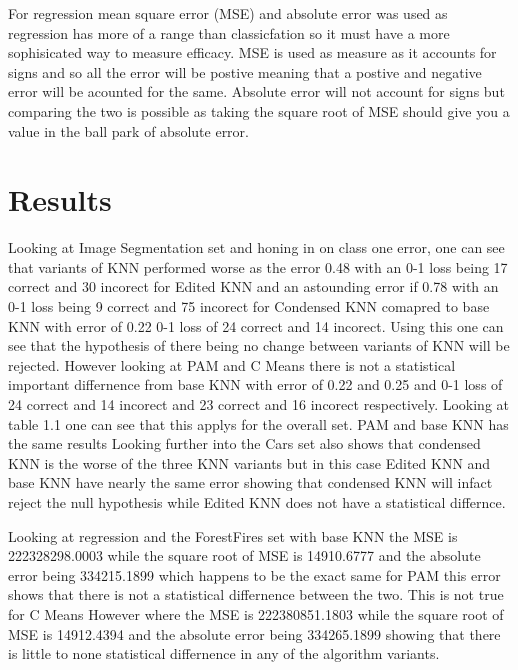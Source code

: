 \documentclass[twoside,11pt]{article}
\begin{document}
For regression mean square error (MSE) and absolute error was used as regression has more of a range than classicfation so it must 
have a more sophisicated way to measure efficacy. MSE is used as measure as it accounts for signs and so all the error will be postive
meaning that a postive and negative error will be acounted for the same. Absolute error will not account for signs but comparing the two
is possible as taking the square root of MSE should give you a value in the ball park of absolute error. 



\section{Results}
Looking at Image Segmentation set and honing in on class one error, one can see that variants of KNN performed worse as the error 0.48 with an 0-1 loss being 
17 correct and 30 incorect for Edited KNN and an astounding error if 0.78 with an 0-1 loss being 9 correct and 75 incorect for Condensed KNN 
comapred to base KNN with error of 0.22 0-1 loss of 24 correct and 14 incorect.  Using this one can see that the hypothesis of there being no change 
between variants of KNN will be rejected.  However looking at PAM and C Means there is not a statistical important differnence from base KNN with error
of 0.22 and 0.25 and 0-1 loss of 24 correct and 14 incorect and 23 correct and 16 incorect respectively. Looking at table 1.1 one can see that this applys
for the overall set.
PAM and base KNN has the same results Looking further into the Cars set also shows that condensed KNN is the worse of the three KNN variants but 
in this case Edited KNN and base KNN  have nearly the same error
showing that condensed KNN will infact reject the null hypothesis while Edited KNN does not have a statistical differnce.  

Looking at regression and the ForestFires set with base KNN the MSE is 222328298.0003 while the square root of MSE is 14910.6777
and the absolute error being 334215.1899 which happens to be  the exact same for PAM this error shows that there is not a statistical differnence
between the two.  This is not true for C Means However where the MSE is 222380851.1803 while the square root of MSE is 14912.4394 and the 
absolute error being 334265.1899 showing that there is little to none statistical differnence in any of the algorithm variants.  






\newpage





\vskip 0.2in

\end{document}

